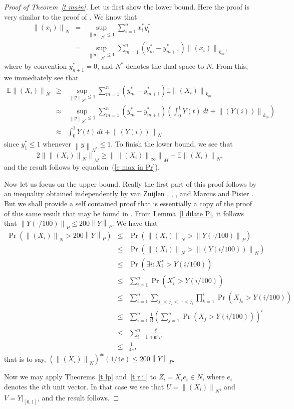 \documentclass[12pt]{amsart}
\newcommand{\E}{{\mathbb E}}
\newcommand{\normo}[1]{{\left\|#1\right\|}}
\newcommand{\snormo}[1]{{\mathopen\|#1\mathclose\|}}
\begin{document}
\begin{proof}[Proof of Theorem~\ref{t main}]
Let us first show the lower bound.  
Here the proof is very similar
to the proof of \cite[Theorem 27]{montgomery-smith-semenov}.
We know that
\begin{eqnarray*}
   \snormo{(x_i)}_N
   &=&
   \sup_{\snormo y_{N^*} \le 1}
   \sum_{i=1}^n x_i^* y_i^*  \\
   &=&
   \sup_{\normo y_{N^*} \le 1}
   \sum_{m=1}^n (y_m^*-y_{m+1}^*) \snormo{(x_i)}_{k_m} ,
\end{eqnarray*}
where by convention $y^*_{n+1} = 0$, and $N^*$ denotes the dual space
to $N$.  
From this, we immediately see
that
\begin{eqnarray*}
   \E \snormo{(X_i)}_N
   &\ge& 
   \sup_{\normo y_{N^*} \le 1}
   \sum_{m=1}^n (y_m^*-y_{m+1}^*)
   \E\snormo{(X_i)}_{k_m} \\
   &\approx&
   \sup_{\normo y_{N^*} \le 1}
   \sum_{m=1}^n (y_m^*-y_{m+1}^*)
   \left(
   \int_0^1 Y(t) \, dt
   +
   \snormo{(Y(i))}_{k_m}
   \right)  \\
   &\approx&
   \int_0^1 Y(t) \, dt
   +
   \snormo{(Y(i))}_N 
\end{eqnarray*}
since $y_1^* \le 1$ whenever $\normo y_{N^*} \le 1$.
To finish the lower bound, we see that
\[ 2\snormo{ \snormo{(X_i)}_N }_M
   \ge \snormo{\snormo{(X_i)}_\infty}_M + \E \snormo{(X_i)}_N , 
\]
and the result follows by equation~(\ref{e max in Pr}).

Now let us focus on the upper bound.  
Really the first part of this proof
follows by an inequality obtained independently by van Zuijlen 
\cite{van zuijlen 1}, \cite{van zuijlen 2}, \cite{van zuijlen 3},
and Marcus and Pisier \cite{marcus-pisier}.  
But we
shall provide a self contained proof that is essentially a copy of 
the proof of this same result that may be found in
\cite[Theorem 5.1]{marcus-zinn}.  
From Lemma~\ref{l dilate P},
it follows that $ \normo{Y(\cdot/100)}_P \le 200 \normo Y_P$.
We have that
\begin{eqnarray*}
   \Pr( \snormo{(X_i)}_N > 200 \normo Y_P )
   &\le&
   \Pr( \snormo{(X_i)}_N > \normo{Y(\cdot/100)}_P ) \\
   &\le&
   \Pr( \snormo{(X_i)}_N > \normo{(Y(i/100))}_N ) \\
   &\le&
   \Pr( \exists i \colon X_i^* > Y(i/100) ) \\
   &\le&
   \sum_{i=1}^n
   \Pr( X_i^* > Y(i/100) ) \\
   &\le&
   \sum_{i=1}^n
   \sum_{j_1<j_2<\cdots<j_i}
   \prod_{k=1}^i \Pr( X_{j_k} > Y(i/100) ) \\
   &\le&
   \sum_{i=1}^n
   \frac1{i!} \left(\sum_{j=1}^n \Pr(X_j > Y(i/100))\right)^i \\
   &\le&
   \sum_{i=1}^n
   \frac{i^i}{100^i i!} \\
   &\le&
   \frac1{4e} ,
\end{eqnarray*}
that is to say, $(\normo{(X_i)}_N)^\#(1/4e) \le 200 \normo Y_P$.

Now we may apply Theorems~\ref{t lp} and~\ref{t r.i.} to 
$Z_i = X_i e_i \in N$, where $e_i$ denotes the $i$th unit vector.
In that case we see that $U = \snormo{(X_i)}_N$, and $V = Y|_{[0,1]}$,
and the result follows.
\end{proof}
\end{document}
